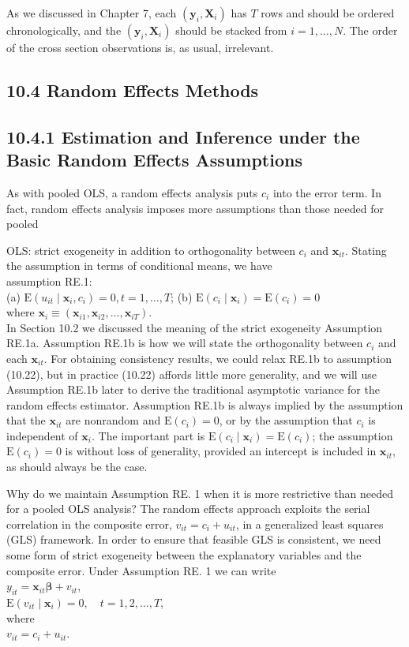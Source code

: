 \documentclass[10pt]{article}
\begin{document}
As we discussed in Chapter 7, each $\left(\mathbf{y}_{i}, \mathbf{X}_{i}\right)$ has $T$ rows and should be ordered chronologically, and the $\left(\mathbf{y}_{i}, \mathbf{X}_{i}\right)$ should be stacked from $i=1, \ldots, N$. The order of the cross section observations is, as usual, irrelevant.

\subsection*{10.4 Random Effects Methods}
\subsection*{10.4.1 Estimation and Inference under the Basic Random Effects Assumptions}
As with pooled OLS, a random effects analysis puts $c_{i}$ into the error term. In fact, random effects analysis imposes more assumptions than those needed for pooled

OLS: strict exogeneity in addition to orthogonality between $c_{i}$ and $\mathbf{x}_{i t}$. Stating the assumption in terms of conditional means, we have\\
assumption RE.1:\\
(a) $\mathrm{E}\left(u_{i t} \mid \mathbf{x}_{i}, c_{i}\right)=0, t=1, \ldots, T$; (b) $\mathrm{E}\left(c_{i} \mid \mathbf{x}_{i}\right)=\mathrm{E}\left(c_{i}\right)=0$\\
where $\mathbf{x}_{i} \equiv\left(\mathbf{x}_{i 1}, \mathbf{x}_{i 2}, \ldots, \mathbf{x}_{i T}\right)$.\\
In Section 10.2 we discussed the meaning of the strict exogeneity Assumption RE.1a. Assumption RE.1b is how we will state the orthogonality between $c_{i}$ and each $\mathbf{x}_{i t}$. For obtaining consistency results, we could relax RE.1b to assumption (10.22), but in practice (10.22) affords little more generality, and we will use Assumption RE.1b later to derive the traditional asymptotic variance for the random effects estimator. Assumption RE.1b is always implied by the assumption that the $\mathbf{x}_{i t}$ are nonrandom and $\mathrm{E}\left(c_{i}\right)=0$, or by the assumption that $c_{i}$ is independent of $\mathbf{x}_{i}$. The important part is $\mathrm{E}\left(c_{i} \mid \mathbf{x}_{i}\right)=\mathrm{E}\left(c_{i}\right)$; the assumption $\mathrm{E}\left(c_{i}\right)=0$ is without loss of generality, provided an intercept is included in $\mathbf{x}_{i t}$, as should always be the case.

Why do we maintain Assumption RE. 1 when it is more restrictive than needed for a pooled OLS analysis? The random effects approach exploits the serial correlation in the composite error, $v_{i t}=c_{i}+u_{i t}$, in a generalized least squares (GLS) framework. In order to ensure that feasible GLS is consistent, we need some form of strict exogeneity between the explanatory variables and the composite error. Under Assumption RE. 1 we can write\\
$y_{i t}=\mathbf{x}_{i t} \boldsymbol{\beta}+v_{i t}$,\\
$\mathrm{E}\left(v_{i t} \mid \mathbf{x}_{i}\right)=0, \quad t=1,2, \ldots, T$,\\
where\\
$v_{i t}=c_{i}+u_{i t}$.
\end{document}
